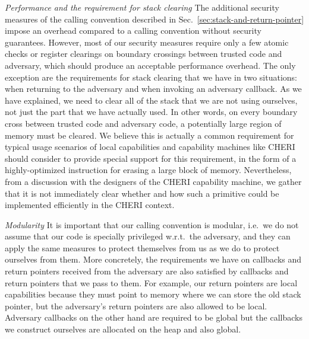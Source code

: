 \documentclass{llncs}
\newcommand{\sectionname}{Sec.}
\begin{document}
\emph{Performance and the requirement for stack clearing} The additional
security measures of the calling convention described in
\sectionname~\ref{sec:stack-and-return-pointer} impose an overhead compared to a
calling convention without security guarantees. However, most of our security
measures require only a few atomic checks or register clearings on boundary
crossings between trusted code and adversary, which should produce an acceptable
performance overhead. The only exception are the requirements for stack clearing
that we have in two situations: when returning to the adversary and when
invoking an adversary callback. As we have explained, we need to clear all of
the stack that we are not using ourselves, not just the part that we have
actually used. In other words, on every boundary cross between trusted code and
adversary code, a potentially large region of memory must be cleared. We believe
this is actually a common requirement for typical usage scenarios of local
capabilities and capability machines like CHERI should consider to provide
special support for this requirement, in the form of a highly-optimized
instruction for erasing a large block of memory. Nevertheless, from a discussion
with the designers of the CHERI capability machine, we gather that it is not immediately
clear whether and how such a primitive could be implemented efficiently in the CHERI context.

\emph{Modularity} It is important that our calling convention is modular, i.e.\ 
we do not assume that our code is specially privileged w.r.t.\ the adversary, and
they can apply the same measures to protect themselves from us as we do to
protect ourselves from them. More concretely, the requirements we have on
callbacks and return pointers received from the adversary are also satisfied by
callbacks and return pointers that we pass to them. For example, our return
pointers are local capabilities because they must point to memory where we can
store the old stack pointer, but the adversary's return pointers are also
allowed to be local. Adversary callbacks on the other hand are required to
be global but the callbacks we construct ourselves are allocated on the heap and
also global. 
\end{document}
